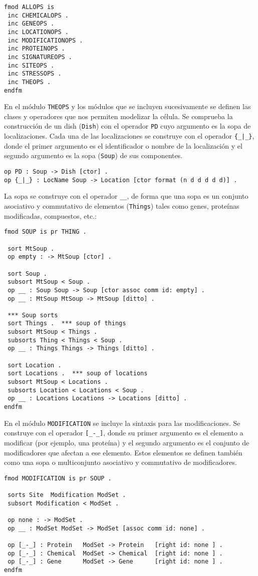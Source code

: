 \begin{lstlisting}[label=ALLOPS,language=Maude,caption={Módulo \texttt{ALLOPS}}]
fmod ALLOPS is
 inc CHEMICALOPS .
 inc GENEOPS .
 inc LOCATIONOPS .
 inc MODIFICATIONOPS .
 inc PROTEINOPS .
 inc SIGNATUREOPS .
 inc SITEOPS .
 inc STRESSOPS .
 inc THEOPS .
endfm
\end{lstlisting}

En el módulo \texttt{THEOPS} y los módulos que se incluyen sucesivamente se definen las clases y operadores que nos permiten modelizar la célula.
Se comprueba la construcción de un dish (\texttt{Dish}) con el operador \texttt{PD} cuyo argumento es la sopa de localizaciones. Cada una de las localizaciones se construye con el operador \verb${_|_}$, donde el primer argumento es el identificador o nombre de la localización y el segundo argumento es la sopa (\texttt{Soup}) de sus componentes.
\begin{lstlisting}[language=Maude]
op PD : Soup -> Dish [ctor] .
op {_|_} : LocName Soup -> Location [ctor format (n d d d d d)] .
\end{lstlisting}

La sopa se construye con el operador \verb$__$, de forma que una sopa es un conjunto asociativo y commutativo de elementos (\texttt{Things}) tales como genes, proteínas modificadas, compuestos, etc.:
\begin{lstlisting}[language=Maude]
fmod SOUP is pr THING .

 sort MtSoup .
 op empty : -> MtSoup [ctor] .  

 sort Soup .
 subsort MtSoup < Soup .
 op __ : Soup Soup -> Soup [ctor assoc comm id: empty] .
 op __ : MtSoup MtSoup -> MtSoup [ditto] .

 *** Soup sorts
 sort Things .  *** soup of things
 subsort MtSoup < Things .
 subsorts Thing < Things < Soup .
 op __ : Things Things -> Things [ditto] .

 sort Location .
 sort Locations .  *** soup of locations
 subsort MtSoup < Locations .
 subsorts Location < Locations < Soup . 
 op __ : Locations Locations -> Locations [ditto] .
endfm
\end{lstlisting}
\medskip

En el módulo \texttt{MODIFICATION} se incluye la sintaxis para las modificaciones. Se construye con el operador 
\verb$[_-_]$, donde su primer argumento es el elemento a modificar (por ejemplo, una proteína) y el segundo argumento es el conjunto de modificadores que afectan a ese elemento. Estos elementos se definen también como una sopa o multiconjunto asociativo y commutativo de modificadores.
\begin{lstlisting}[language=Maude]
fmod MODIFICATION is pr SOUP .  
 
 sorts Site  Modification ModSet .
 subsort Modification < ModSet . 

 op none : -> ModSet . 
 op __ : ModSet ModSet -> ModSet [assoc comm id: none] . 

 op [_-_] : Protein   ModSet -> Protein   [right id: none ] .
 op [_-_] : Chemical  ModSet -> Chemical  [right id: none ] .
 op [_-_] : Gene      ModSet -> Gene      [right id: none ] .
endfm
\end{lstlisting}
\bigskip

